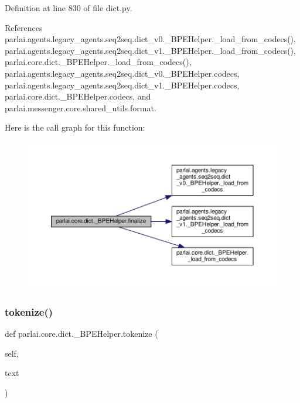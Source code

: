 Definition at line 830 of file dict.\+py.



References parlai.\+agents.\+legacy\+\_\+agents.\+seq2seq.\+dict\+\_\+v0.\+\_\+\+B\+P\+E\+Helper.\+\_\+load\+\_\+from\+\_\+codecs(), parlai.\+agents.\+legacy\+\_\+agents.\+seq2seq.\+dict\+\_\+v1.\+\_\+\+B\+P\+E\+Helper.\+\_\+load\+\_\+from\+\_\+codecs(), parlai.\+core.\+dict.\+\_\+\+B\+P\+E\+Helper.\+\_\+load\+\_\+from\+\_\+codecs(), parlai.\+agents.\+legacy\+\_\+agents.\+seq2seq.\+dict\+\_\+v0.\+\_\+\+B\+P\+E\+Helper.\+codecs, parlai.\+agents.\+legacy\+\_\+agents.\+seq2seq.\+dict\+\_\+v1.\+\_\+\+B\+P\+E\+Helper.\+codecs, parlai.\+core.\+dict.\+\_\+\+B\+P\+E\+Helper.\+codecs, and parlai.\+messenger.\+core.\+shared\+\_\+utils.\+format.

Here is the call graph for this function\+:
\nopagebreak
\begin{figure}[H]
\begin{center}
\leavevmode
\includegraphics[width=350pt]{classparlai_1_1core_1_1dict_1_1__BPEHelper_ae93cf51522695ac3f45fc19eee94f64c_cgraph}
\end{center}
\end{figure}
\mbox{\label{classparlai_1_1core_1_1dict_1_1__BPEHelper_a1492c4bca01a00536eef0e3cc15f134b}} 
\subsubsection{\texorpdfstring{tokenize()}{tokenize()}}
{\footnotesize\ttfamily def parlai.\+core.\+dict.\+\_\+\+B\+P\+E\+Helper.\+tokenize (\begin{DoxyParamCaption}\item[{}]{self,  }\item[{}]{text }\end{DoxyParamCaption})}

